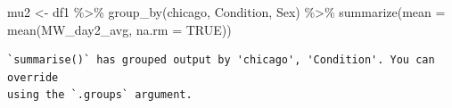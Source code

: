 \documentclass[
  letterpaper,
  DIV=11,
  numbers=noendperiod]{scrartcl}
\newenvironment{Shaded}{\begin{snugshade}}{\end{snugshade}}
\newcommand{\AttributeTok}[1]{\textcolor[rgb]{0.49,0.56,0.16}{#1}}
\newcommand{\ConstantTok}[1]{\textcolor[rgb]{0.53,0.00,0.00}{#1}}
\newcommand{\FunctionTok}[1]{\textcolor[rgb]{0.02,0.16,0.49}{#1}}
\newcommand{\NormalTok}[1]{\textcolor[rgb]{0.00,0.44,0.13}{#1}}
\newcommand{\OtherTok}[1]{\textcolor[rgb]{0.00,0.44,0.13}{#1}}
\newcommand{\SpecialCharTok}[1]{\textcolor[rgb]{0.25,0.44,0.63}{#1}}
\begin{document}
\begin{Shaded}
\begin{Highlighting}[]
\NormalTok{mu2 }\OtherTok{\textless{}{-}}\NormalTok{ df1 }\SpecialCharTok{\%\textgreater{}\%} \FunctionTok{group\_by}\NormalTok{(chicago, Condition, Sex) }\SpecialCharTok{\%\textgreater{}\%} \FunctionTok{summarize}\NormalTok{(}\AttributeTok{mean =} \FunctionTok{mean}\NormalTok{(MW\_day2\_avg, }\AttributeTok{na.rm =} \ConstantTok{TRUE}\NormalTok{))}
\end{Highlighting}
\end{Shaded}

\begin{verbatim}
`summarise()` has grouped output by 'chicago', 'Condition'. You can override
using the `.groups` argument.
\end{verbatim}
\end{document}
